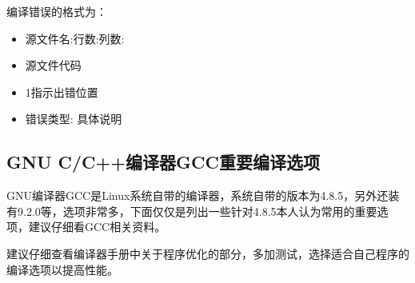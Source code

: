 \documentclass[a4paper,12pt,english]{sphinxmanual}
\begin{document}
\sphinxAtStartPar
编译错误的格式为：
\begin{itemize}
\item {} 
\sphinxAtStartPar
源文件名:行数:列数:

\item {} 
\sphinxAtStartPar
源文件代码

\item {} 
\sphinxAtStartPar
1指示出错位置

\item {} 
\sphinxAtStartPar
错误类型: 具体说明

\end{itemize}


\subsection{GNU C/C++编译器GCC重要编译选项}
\label{\detokenize{compiler/gnu:gnu-c-c-gcc}}
\sphinxAtStartPar
GNU编译器GCC是Linux系统自带的编译器，系统自带的版本为4.8.5，另外还装有9.2.0等，选项非常多，下面仅仅是列出一些针对4.8.5本人认为常用的重要选项，建议仔细看GCC相关资料。

\sphinxAtStartPar
建议仔细查看编译器手册中关于程序优化的部分，多加测试，选择适合自己程序的编译选项以提高性能。
\end{document}
